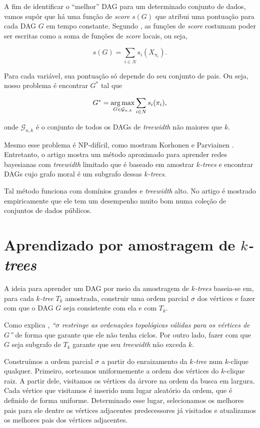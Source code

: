 \vspace{2em}

A fim de identificar o ``melhor'' DAG para um determinado conjunto de dados, vamos supôr que há uma função de \emph{score} $s(G)$ que atribui uma pontuação para cada DAG $G$ em tempo constante. Segundo \cite{nie}, as funções de \emph{score} costumam poder ser escritas como a soma de funções de \emph{score} locais, ou seja,

$$s(G) = \sum_{i \in N} s_i(X_{\pi_i}).$$

Para cada variável, sua pontuação só depende do seu conjunto de pais. Ou seja, nosso problema é encontrar $G^*$ tal que

$$G^* = \operatorname*{arg\,max}_{G \in \mathcal{G}_{n,k}} \sum_{i \in N} s_i(\pi_i),$$

onde $\mathcal{G}_{n,k}$ é o conjunto de todos os DAGs de \emph{treewidth} não maiores que $k$.

Mesmo esse problema é NP-difícil, como mostram Korhonen e Parviainen \cite{korhonen}. Entretanto, o artigo \cite{maua} mostra um método aproximado para aprender redes bayesianas com \emph{treewidth} limitado que é baseado em amostrar \emph{$k$-trees} e encontrar DAGs cujo grafo moral é um subgrafo dessas \emph{$k$-trees}.

Tal método funciona com domínios grandes e \emph{treewidth} alto. No artigo é mostrado empiricamente que ele tem um desempenho muito bom numa coleção de conjuntos de dados públicos.

\section{Aprendizado por amostragem de \emph{$k$-trees}}
\label{sec:aprendizado}

A ideia para aprender um DAG por meio da amostragem de \emph{$k$-trees} baseia-se em, para cada \emph{$k$-tree} $T_k$ amostrada, construir uma ordem parcial $\sigma$ dos vértices e fazer com que o DAG $G$ seja consistente com ela e com $T_k$.

Como explica \cite{maua}, \emph{``$\sigma$ restringe as ordenações topológicas válidas para os vértices de $G$''} de forma que garante que ele não tenha ciclos. Por outro lado, fazer com que $G$ seja subgrafo de $T_k$ garante que seu \emph{treewidth} não exceda $k$.

Construímos a ordem parcial $\sigma$ a partir do enraizamento da \emph{$k$-tree} num $k$-clique qualquer. Primeiro, sorteamos uniformemente a ordem dos vértices do $k$-clique raiz. A partir dele, visitamos os vértices da árvore na ordem da busca em largura. Cada vértice que visitamos é inserido num lugar aleatório da ordem, que é definido de forma uniforme. Determinado esse lugar, selecionamos os melhores pais para ele dentre os vértices adjacentes predecessores já visitados e atualizamos os melhores pais dos vértices adjacentes.

